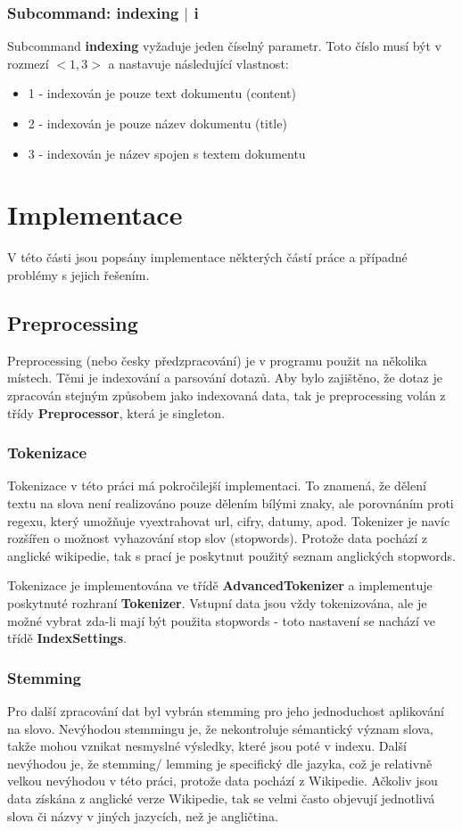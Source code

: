 \documentclass[12pt, letterpaper]{article}
\begin{document}
\subsubsection{Subcommand: indexing $|$ i}
Subcommand \textbf{indexing} vyžaduje jeden číselný parametr. Toto číslo musí být v rozmezí $<1,3>$ a nastavuje
následující vlastnost:
\begin{itemize}
    \item 1 - indexován je pouze text dokumentu (content)
    \item 2 - indexován je pouze název dokumentu (title)
    \item 3 - indexován je název spojen s textem dokumentu
\end{itemize}
%
%
%
\section{Implementace}
V této části jsou popsány implementace některých částí práce a případné problémy s jejich řešením.
%
\subsection{Preprocessing}
Preprocessing (nebo česky předzpracování) je v programu použit na několika místech. Těmi je indexování a parsování
dotazů. Aby bylo zajištěno, že dotaz je zpracován stejným způsobem jako indexovaná data, tak je preprocessing volán
z třídy \textbf{Preprocessor}, která je singleton.
%
\subsubsection{Tokenizace}
Tokenizace v této práci má pokročilejší implementaci. To znamená, že dělení textu na slova není realizováno pouze
dělením bílými znaky, ale porovnáním proti regexu, který umožňuje vyextrahovat url, cifry, datumy, apod. Tokenizer
je navíc rozšířen o možnost vyhazování stop slov (stopwords). Protože data pochází z anglické wikipedie, tak
s prací je poskytnut použitý seznam anglických stopwords.

Tokenizace je implementována ve třídě \textbf{AdvancedTokenizer} a implementuje poskytnuté rozhraní \textbf{Tokenizer}.
Vstupní data jsou vždy tokenizována, ale je možné vybrat zda-li mají být použita stopwords - toto nastavení se nachází
ve třídě \textbf{IndexSettings}.
%
\subsubsection{Stemming}
Pro další zpracování dat byl vybrán stemming pro jeho jednoduchost aplikování na slovo. Nevýhodou stemmingu je, že
nekontroluje sémantický význam slova, takže mohou vznikat nesmyslné výsledky, které jsou poté v indexu. Další nevýhodou
je, že stemming/ lemming je specifický dle jazyka, což je relativně velkou nevýhodou v této práci, protože data pochází
z Wikipedie. Ačkoliv jsou data získána z anglické verze Wikipedie, tak se velmi často objevují jednotlivá slova či názvy
v jiných jazycích, než je angličtina.
\end{document}
